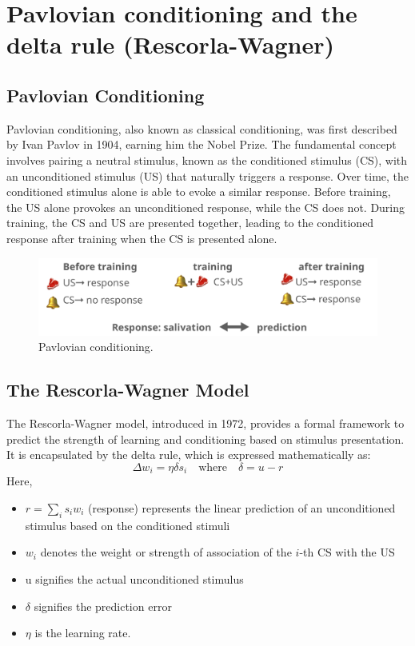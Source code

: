 \documentclass[11pt]{book} %
\begin{document}
\section{Pavlovian conditioning and the delta rule (Rescorla-Wagner)}

\subsection{Pavlovian Conditioning}

Pavlovian conditioning, also known as classical conditioning, was first described by Ivan Pavlov in 1904, earning him the Nobel Prize. 
The fundamental concept involves pairing a neutral stimulus, known as the conditioned stimulus (CS), with an unconditioned stimulus (US) that naturally triggers a response. 
Over time, the conditioned stimulus alone is able to evoke a similar response.
Before training, the US alone provokes an unconditioned response, while the CS does not. During training, the CS and US are presented together, leading to the conditioned response after training when the CS is presented alone.

\begin{figure}[ht]
\centering
\includegraphics[width=\textwidth]{./Figs/pavlov.jpeg}
\caption{Pavlovian conditioning.}
\label{fig:pavlovian_conditioning}
\end{figure}

%
%
%

\subsection{The Rescorla-Wagner Model}
The Rescorla-Wagner model, introduced in 1972, provides a formal framework to predict the strength of learning and conditioning based on stimulus presentation. It is encapsulated by the delta rule, which is expressed mathematically as:
\begin{equation}
    \Delta w_i = \eta \delta s_i \quad \text{where} \quad \delta = u - r
\end{equation}
Here, 
\begin{itemize}
    \item \( r = \sum_i s_i w_i \) (response) represents the linear prediction of an unconditioned stimulus based on the conditioned stimuli
    \item \( w_i \) denotes the weight or strength of association of the \( i \)-th CS with the US
    \item u signifies the actual unconditioned stimulus 
    \item \( \delta \) signifies the prediction error 
    \item \( \eta \) is the learning rate. 
\end{itemize}
\end{document}
